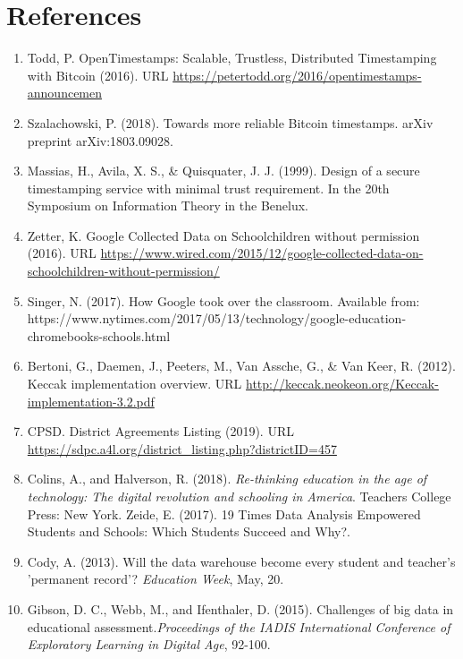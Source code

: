 \documentclass{article}
\begin{document}
\section{References}
\begin{enumerate}
    \label{sec:1}
    \item Todd, P. OpenTimestamps: Scalable, Trustless, Distributed Timestamping with Bitcoin (2016). URL \url{https://petertodd.org/2016/opentimestamps-announcemen}
    \label{sec:2}
    \item Szalachowski, P. (2018). Towards more reliable Bitcoin timestamps. arXiv preprint arXiv:1803.09028.
    \label{sec:3}
    \item Massias, H., Avila, X. S., \& Quisquater, J. J. (1999). Design of a secure timestamping service with minimal trust requirement. In the 20th Symposium on Information Theory in the Benelux.
    \label{sec:4}
    \item Zetter, K. Google Collected Data on Schoolchildren without permission (2016). URL \url{https://www.wired.com/2015/12/google-collected-data-on-schoolchildren-without-permission/}
    \label{sec:5}
    \item Singer, N. (2017). How Google took over the classroom. Available from: https://www.nytimes.com/2017/05/13/technology/google-education-chromebooks-schools.html
    \label{sec:6}
    \item Bertoni, G., Daemen, J., Peeters, M., Van Assche, G., \& Van Keer, R. (2012). Keccak implementation overview. URL  \url{http://keccak.neokeon.org/Keccak-implementation-3.2.pdf}
    \label{sec:7}
    \item CPSD. District Agreements Listing (2019). URL  \url{https://sdpc.a4l.org/district_listing.php?districtID=457}
    \label{sec:8}
    \item Colins, A., and Halverson, R. (2018).\textit{ Re-thinking education in the age of technology: The digital revolution and schooling in America}. Teachers College Press: New York.
    \label{sec:9}
    Zeide, E. (2017). 19 Times Data Analysis Empowered Students and Schools: Which Students Succeed and Why?.
    \label{sec:10}
    \item Cody, A. (2013). Will the data warehouse become every student and teacher's 'permanent record'? \textit{Education Week}, May, 20.
    \label{sec:11}
    \item Gibson, D. C., Webb, M., and Ifenthaler, D. (2015). Challenges of big data in educational assessment.\textit{Proceedings of the IADIS International Conference of Exploratory Learning in Digital Age}, 92-100.

\end{enumerate}
\end{document}
